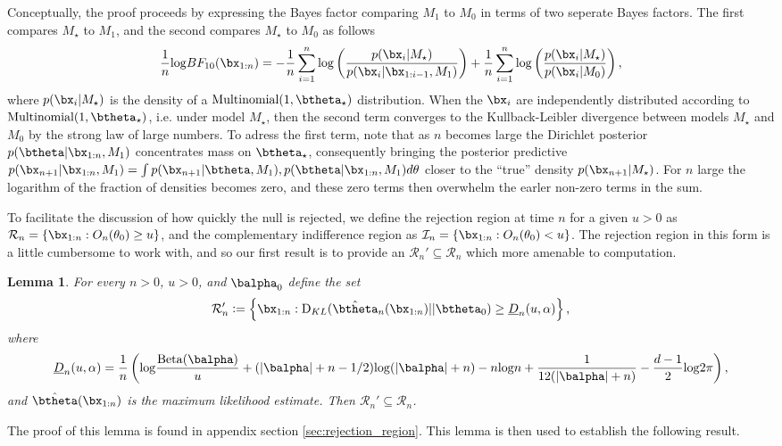 \documentclass[11pt]{article}
\def\log{{\rm log}}
\newcommand{\Beta}{\mathrm{Beta}}
\newcommand{\KL}{\mathrm{D}_{KL}}
\newtheorem{lemma}{Lemma}[section]
\newcommand{\df}{\vcentcolon=}
\begin{document}
Conceptually, the proof proceeds by expressing the Bayes factor comparing $M_1$ to $M_0$ in terms of two seperate Bayes factors.
The first compares $M_{\star}$ to $M_1$, and the second compares $M_{\star}$ to $M_0$ as follows
\begin{align*}
 \frac{1}{n} \log BF_{10}(\bx_{1:n}) = - \frac{1}{n}\sum_{i=1}^{n}\log \left( \frac{p(\bx_{i}|M_\star)}{p(\bx_{i}|\bx_{1:i-1},M_1)}\right) + \frac{1}{n}\sum_{i=1}^{n} \log  \left( \frac{p(\bx_{i}|M_\star)}{p(\bx_{i}|M_0)}\right),\\
\end{align*}
where  $p(\bx_i|M_\star)$ is the density of a $\text{Multinomial}(1,\btheta_{\star})$ distribution.
When the $\bx_i$ are independently distributed according to $\text{Multinomial}(1, \btheta_\star)$, i.e.
under model $M_\star$, then the second term converges to the Kullback-Leibler divergence between models $M_\star$ and $M_0$ by the strong law of large numbers.
To adress the first term, note that as $n$ becomes large the Dirichlet posterior $p(\btheta|\bx_{1:n}, M_1)$ concentrates mass on $\btheta_\star$, consequently bringing the posterior predictive $p(\bx_{n+1}|\bx_{1:n},M_1) =\int p(\bx_{n+1}|\btheta,M_1),p(\btheta|\bx_{1:n},M_1) d\theta$ closer to the ``true'' density $p(\bx_{n+1}|M_{\star})$.
For $n$ large the logarithm of the fraction of densities becomes zero, and these zero terms then overwhelm the earler non-zero terms in the sum.

To facilitate the discussion of how quickly the null is rejected, we define the rejection region at time $n$ for a given $u>0$ as $\mathcal{R}_n = \{ \bx_{1:n} : O_n(\theta_0) \geq u \}$,
and the complementary indifference region as $\mathcal{I}_n = \{ \bx_{1:n} : O_n(\theta_0) < u \}$. 
The rejection region in this form is a little cumbersome to work with,
and so our first result is to provide an $\mathcal R_n'\subseteq \mathcal R_n$ which more amenable to computation.
\begin{lemma}\label{thm:calRprime}
  For every $n>0$, $u>0$, and $\balpha_0$ define the set
  \begin{equation}
    \label{eq:decision_boundary}
    \mathcal R_n'\df 
    \left\{
      \bx_{1:n} :
      \KL(\hat\btheta_n(\bx_{1:n})|| \btheta_0)
      \geq \underline{D}_n(u,\alpha) 
    \right\},
  \end{equation}
  where
  \begin{equation*}
    \underline{D}_n(u,\alpha) = \frac{1}{n}\left( \log \frac{\Beta(\balpha)}{u} +(|\balpha|+n-1/2)\log(|\balpha|+n)-n\log n + \frac{1}{12(|\balpha|+n)} - \frac{d-1}{2}\log 2\pi\right),
  \end{equation*}
  and $\hat{\btheta}(\bx_{1:n})$ is the maximum likelihood estimate.
Then $\mathcal{R}_n'  \subseteq \mathcal R_n$.
\end{lemma}
The proof of this lemma is found in appendix section \ref{sec:rejection_region}.
This lemma is then used to establish the following result.
\end{document}
